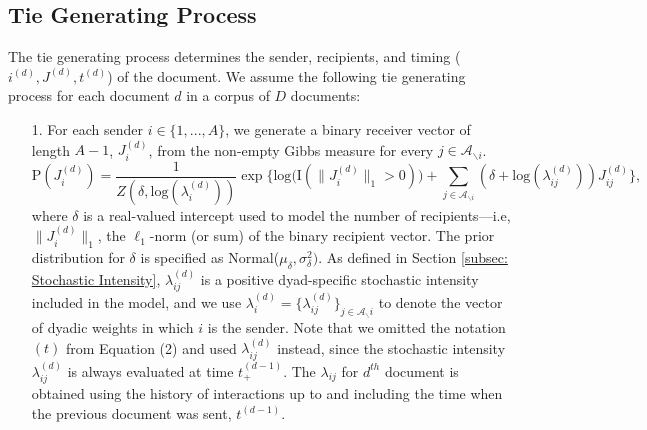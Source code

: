 \documentclass[a4paper]{article}
\begin{document}
\subsection{Tie Generating Process}\label{subsec: Tie Generating Process} 
The tie generating process determines the sender, recipients, and timing ($i^{(d)}, J^{(d)}, t^{(d)}$) of the document.
We assume the following tie generating process for each document $d$ in a corpus of $D$ documents:
\begin{itemize} 
	\item[1.] For each sender $i \in \{1,...,A\}$, we generate a binary receiver vector of length $A-1$, $J^{(d)}_i$, from the non-empty Gibbs measure \citep{fellows2017removing} for every $j \in \mathcal{A}_{\backslash i}$. 
% 
	\begin{equation} \text{P}(J_i^{(d)}) = \frac{1}{Z(\delta,\mbox{log}(\lambda_i^{(d)}))} \exp\Big\{ \mbox{log}\big(\text{I}( \lVert J_i^{(d)} \rVert_1 > 0 )\big) + \sum_{j \in \mathcal{A}_{\backslash i}} (\delta+\mbox{log}(\lambda_{ij}^{(d)}))J_{ij}^{(d)} \Big\},
	\end{equation}
% 
	where $\delta$ is a real-valued intercept used to model the number of recipients---i.e, $\lVert J_{i}^{(d)} \rVert_1$, the $\ell_1$-norm (or sum) of the binary recipient vector. The prior distribution for $\delta$ is specified as Normal($\mu_\delta, \sigma^2_\delta)$. As defined in Section \ref{subsec: Stochastic Intensity}, $\lambda_{ij}^{(d)}$ is a positive dyad-specific stochastic intensity included in the model, and we use $\lambda_{i}^{(d)}=\{\lambda_{ij}^{(d)}\}_{j\in \mathcal{A}_\backslash i}$ to denote the vector of dyadic weights in which $i$ is the sender. Note that we omitted the notation $(t)$ from Equation (2) and used $\lambda_{ij}^{(d)}$ instead, since the stochastic intensity $\lambda_{ij}^{(d)}$ is always evaluated at time $t_+^{(d-1)}$. The $\lambda_{ij}$ for $d^{th}$ document is obtained using the history of interactions up to and including the time when the previous document was sent, $t^{(d-1)}$. 
	

\end{itemize}
\end{document}
